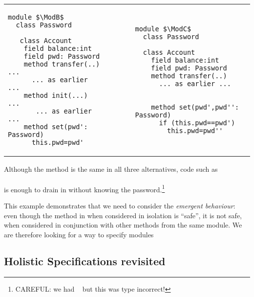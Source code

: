 \begin{tabular}{lll}
\begin{minipage}[b]{0.42\textwidth}
\begin{lstlisting}[mathescape=true, language=chainmail, frame=lines]
module $\ModB$
  class Password
  
   class Account
    field balance:int 
    field pwd: Password 
    method transfer(..) ...
      ... as earlier ...
    method init(...) ...
       ... as earlier ...
    method set(pwd': Password)
      this.pwd=pwd'
\end{lstlisting}
\end{minipage}
&\ \ \  \ \   &%
\begin{minipage}[b]{0.45\textwidth}
\begin{lstlisting}[mathescape=true, language=chainmail, frame=lines]
module $\ModC$
  class Password

  class Account
    field balance:int 
    field pwd: Password 
    method transfer(..) 
      ... as earlier ...
    
    
    method set(pwd',pwd'': Password)
      if (this.pwd==pwd') 
        this.pwd=pwd''
\end{lstlisting}
\end{minipage} 
\end{tabular}

Although the  method is the same in
all three alternatives, %
code  {such as}
\\ 
$\ \strut \hspace{.2in} $  
\\ 
is enough to drain   in \ModB without knowing the password.\footnote{CAREFUL: we had 
$\ \strut \hspace{.01in} $  but this was type incorrect!}

This example demonstrates that we need to consider the \emph{emergent behaviour}: even though the method  in  \ModB when considered in isolation is ``safe'', it is not safe, 
when considered in conjunction with other methods from the same module. We are therefore looking for a way to specify modules 


\subsection{Holistic Specifications revisited}
\label{s:approach:necopers}

